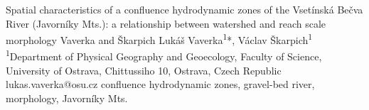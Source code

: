 \abstract
{Spatial characteristics of a confluence hydrodynamic zones of the Vsetínská Bečva River (Javorníky Mts.): a relationship between watershed and reach scale morphology} 
{Vaverka and Škarpich} 
{Lukáš Vaverka\textsuperscript{1}*, Václav Škarpich\textsuperscript{1}} 
{\TLtag} 
{
	\textsuperscript{1}Department of Physical Geography and Geoecology, Faculty of Science, University of Ostrava, Chittussiho 10, Ostrava, Czech Republic
}
{lukas.vaverka@osu.cz}  %
{confluence hydrodynamic zones, gravel-bed river, morphology, Javorníky Mts.}
